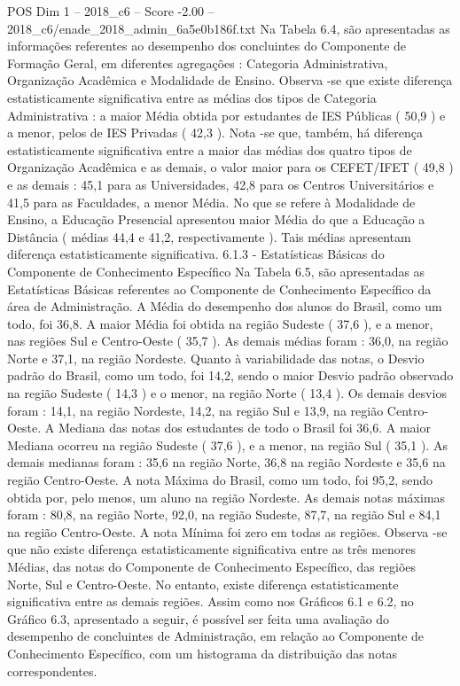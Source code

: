 \begin{textsample}{POS Dim 1 – 2018\_c6 – Score -2.00 – 2018\_c6/enade\_2018\_admin\_6a5e0b186f.txt}
Na Tabela 6.4, são apresentadas as informações referentes ao desempenho dos concluintes do Componente de Formação Geral, em diferentes agregações : Categoria Administrativa, Organização Acadêmica e Modalidade de Ensino.
Observa -se que existe diferença estatisticamente significativa entre as médias dos tipos de Categoria Administrativa : a maior Média obtida por estudantes de IES Públicas ( 50,9 ) e a menor, pelos de IES Privadas ( 42,3 ).
Nota -se que, também, há diferença estatisticamente significativa entre a maior das médias dos quatro tipos de Organização Acadêmica e as demais, o valor maior para os CEFET/IFET ( 49,8 ) e as demais : 45,1 para as Universidades, 42,8 para os Centros Universitários e 41,5 para as Faculdades, a menor Média.
No que se refere à Modalidade de Ensino, a Educação Presencial apresentou maior Média do que a Educação a Distância ( médias 44,4 e 41,2, respectivamente ).
Tais médias apresentam diferença estatisticamente significativa. 6.1.3 - Estatísticas Básicas do Componente de Conhecimento Específico Na Tabela 6.5, são apresentadas as Estatísticas Básicas referentes ao Componente de Conhecimento Específico da área de Administração.
A Média do desempenho dos alunos do Brasil, como um todo, foi 36,8.
A maior Média foi obtida na região Sudeste ( 37,6 ), e a menor, nas regiões Sul e Centro-Oeste ( 35,7 ).
As demais médias foram : 36,0, na região Norte e 37,1, na região Nordeste.
Quanto à variabilidade das notas, o Desvio padrão do Brasil, como um todo, foi 14,2, sendo o maior Desvio padrão observado na região Sudeste ( 14,3 ) e o menor, na região Norte ( 13,4 ).
Os demais desvios foram : 14,1, na região Nordeste, 14,2, na região Sul e 13,9, na região Centro-Oeste.
A Mediana das notas dos estudantes de todo o Brasil foi 36,6.
A maior Mediana ocorreu na região Sudeste ( 37,6 ), e a menor, na região Sul ( 35,1 ).
As demais medianas foram : 35,6 na região Norte, 36,8 na região Nordeste e 35,6 na região Centro-Oeste.
A nota Máxima do Brasil, como um todo, foi 95,2, sendo obtida por, pelo menos, um aluno na região Nordeste.
As demais notas máximas foram : 80,8, na região Norte, 92,0, na região Sudeste, 87,7, na região Sul e 84,1 na região Centro-Oeste.
A nota Mínima foi zero em todas as regiões.
Observa -se que não existe diferença estatisticamente significativa entre as três menores Médias, das notas do Componente de Conhecimento Específico, das regiões Norte, Sul e Centro-Oeste.
No entanto, existe diferença estatisticamente significativa entre as demais regiões.
Assim como nos Gráficos 6.1 e 6.2, no Gráfico 6.3, apresentado a seguir, é possível ser feita uma avaliação do desempenho de concluintes de Administração, em relação ao Componente de Conhecimento Específico, com um histograma da distribuição das notas correspondentes.

\end{textsample}
